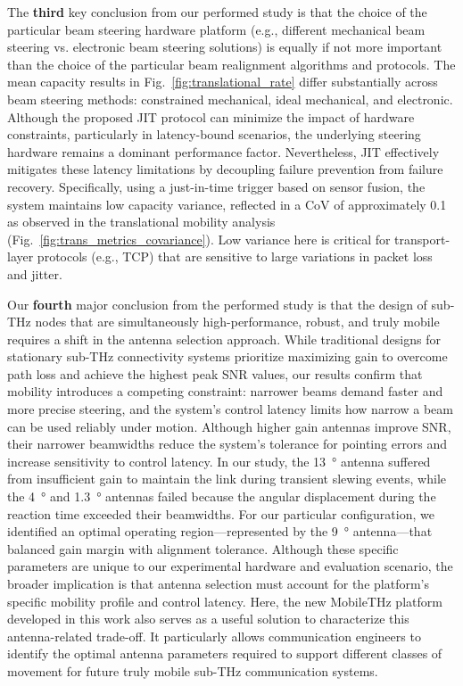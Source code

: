 \documentclass[fleqn,10pt]{wlscirep}
\begin{document}
The \textbf{third} key conclusion from our performed study is that the choice of the particular beam steering hardware platform (e.g., different mechanical beam steering vs. electronic beam steering solutions) is equally if not more important than the choice of the particular beam realignment algorithms and protocols. The mean capacity results in Fig.~\ref{fig:translational_rate} differ substantially across beam steering methods: constrained mechanical, ideal mechanical, and electronic. Although the proposed JIT protocol can minimize the impact of hardware constraints, particularly in latency-bound scenarios, the underlying steering hardware remains a dominant performance factor. Nevertheless, JIT effectively mitigates these latency limitations by decoupling failure prevention from failure recovery. Specifically, using a just-in-time trigger based on sensor fusion, the system maintains low capacity variance, reflected in a CoV of approximately 0.1 as observed in the translational mobility analysis (Fig.~\ref{fig:trans_metrics_covariance}). Low variance here is critical for transport-layer protocols (e.g., TCP) that are sensitive to large variations in packet loss and jitter\cite{Jacobson1988}.

Our \textbf{fourth} major conclusion from the performed study is that the design of sub-THz nodes that are simultaneously high-performance, robust, and truly mobile requires a shift in the antenna selection approach. While traditional designs for stationary sub-THz connectivity systems prioritize maximizing gain to overcome path loss and achieve the highest peak SNR values, our results confirm that mobility introduces a competing constraint: narrower beams demand faster and more precise steering, and the system's control latency limits how narrow a beam can be used reliably under motion. Although higher gain antennas improve SNR, their narrower beamwidths reduce the system's tolerance for pointing errors and increase sensitivity to control latency. In our study, the \SI{13}{\degree} antenna suffered from insufficient gain to maintain the link during transient slewing events, while the \SI{4}{\degree} and \SI{1.3}{\degree} antennas failed because the angular displacement during the reaction time exceeded their beamwidths. For our particular configuration, we identified an optimal operating region—represented by the \SI{9}{\degree} antenna—that balanced gain margin with alignment tolerance. Although these specific parameters are unique to our experimental hardware and evaluation scenario, the broader implication is that antenna selection must account for the platform's specific mobility profile and control latency. Here, the new MobileTHz platform developed in this work also serves as a useful solution to characterize this antenna-related trade-off. It particularly allows communication engineers to identify the optimal antenna parameters required to support different classes of movement for future truly mobile sub-THz communication systems.
\end{document}
